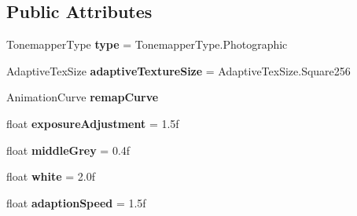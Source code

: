 \subsection*{Public Attributes}
\begin{DoxyCompactItemize}
\item 
Tonemapper\+Type {\bfseries type} = Tonemapper\+Type.\+Photographic\hypertarget{class_unity_standard_assets_1_1_image_effects_1_1_tonemapping_a52e39b9f620d0f6b460858cdc4f38d54}{}\label{class_unity_standard_assets_1_1_image_effects_1_1_tonemapping_a52e39b9f620d0f6b460858cdc4f38d54}

\item 
Adaptive\+Tex\+Size {\bfseries adaptive\+Texture\+Size} = Adaptive\+Tex\+Size.\+Square256\hypertarget{class_unity_standard_assets_1_1_image_effects_1_1_tonemapping_a4e2851e06546da666944b45c7f48b25a}{}\label{class_unity_standard_assets_1_1_image_effects_1_1_tonemapping_a4e2851e06546da666944b45c7f48b25a}

\item 
Animation\+Curve {\bfseries remap\+Curve}\hypertarget{class_unity_standard_assets_1_1_image_effects_1_1_tonemapping_ab123af79fd32ac56e5940bda3060a5fc}{}\label{class_unity_standard_assets_1_1_image_effects_1_1_tonemapping_ab123af79fd32ac56e5940bda3060a5fc}

\item 
float {\bfseries exposure\+Adjustment} = 1.\+5f\hypertarget{class_unity_standard_assets_1_1_image_effects_1_1_tonemapping_a679f2b540067a1881357906f55b97405}{}\label{class_unity_standard_assets_1_1_image_effects_1_1_tonemapping_a679f2b540067a1881357906f55b97405}

\item 
float {\bfseries middle\+Grey} = 0.\+4f\hypertarget{class_unity_standard_assets_1_1_image_effects_1_1_tonemapping_ac020f4984d972d696bb9399b9d7c39b6}{}\label{class_unity_standard_assets_1_1_image_effects_1_1_tonemapping_ac020f4984d972d696bb9399b9d7c39b6}

\item 
float {\bfseries white} = 2.\+0f\hypertarget{class_unity_standard_assets_1_1_image_effects_1_1_tonemapping_af6e2802512825edfbe961a98e62a064e}{}\label{class_unity_standard_assets_1_1_image_effects_1_1_tonemapping_af6e2802512825edfbe961a98e62a064e}

\item 
float {\bfseries adaption\+Speed} = 1.\+5f\hypertarget{class_unity_standard_assets_1_1_image_effects_1_1_tonemapping_a66ae33480c09153c1edd26b393f59b7b}{}\label{class_unity_standard_assets_1_1_image_effects_1_1_tonemapping_a66ae33480c09153c1edd26b393f59b7b}


\end{DoxyCompactItemize}
